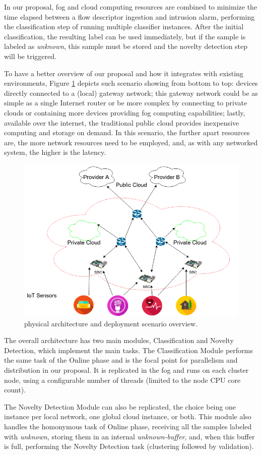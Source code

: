 In our proposal, fog and cloud computing resources are combined to minimize
the time elapsed between a flow descriptor ingestion and intrusion alarm,
performing the classification step of \minas running multiple
classifier instances.
After the initial classification, the resulting label can be used immediately,
but if the sample is labeled as \emph{unknown}, this sample must be stored and
the novelty detection step will be triggered.

To have a better overview of our proposal and how it integrates with existing
\iot environments, Figure \ref{fig:mfog-phy-arch-cloud} depicts such scenario
showing from bottom to top:
\iot devices directly connected to a (local) gateway network;
this gateway network could be as simple as a single Internet router 
or be more complex by connecting to private clouds or 
containing more devices providing fog computing capabilities;
lastly, available over the internet, the traditional public cloud provides
inexpensive computing and storage on demand.
In this scenario, the further apart resources are, the more network
resources need to be employed, and, as with any networked system, the
higher is the latency.

\begin{figure}[hb]
  \centering
  \includegraphics[width=0.5\linewidth]{figures/cassalesimgs-000.png}
  \caption{\arch \cite{Cassales2019a} physical architecture and deployment scenario overview.}
  \label{fig:mfog-phy-arch-cloud}
\end{figure}

The overall \mfog architecture has two main modules, Classification and Novelty
Detection, which implement the \minas main tasks.
The Classification Module performs the same task of the \minas Online phase and
is the focal point for parallelism and distribution in our proposal.
It is replicated in the fog and runs on each cluster node, using a configurable
number of threads (limited to the node CPU core count).

The Novelty Detection Module can also be replicated,
the choice being one instance per local network, one global cloud instance,
or both.
This module also handles the homonymous task of \minas Online phase, receiving
all the samples labeled with \emph{unknown}, storing them in an internal
\emph{unknown-buffer}, and, when this buffer is full, performing the \minas
Novelty Detection task (clustering followed by validation).

